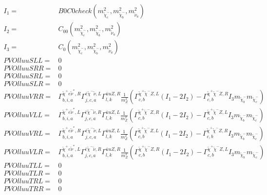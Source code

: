 \documentclass[A4,landscape]{article}
\begin{document}
\begin{align} 
I_1= & B0C0check(m^2_{\tilde{\chi}^-_{{c}}}, m^2_{\tilde{\chi}^-_{{b}}}, m^2_{\tilde{\nu}_{{a}}}) \\ 
I_2= & C_{00}(m^2_{\tilde{\chi}^-_{{c}}}, m^2_{\tilde{\chi}^-_{{b}}}, m^2_{\tilde{\nu}_{{a}}}) \\ 
I_3= & C_0(m^2_{\tilde{\chi}^-_{{c}}}, m^2_{\tilde{\chi}^-_{{b}}}, m^2_{\tilde{\nu}_{{a}}}) \\ 
  PVOlluuSLL= & 0 \\ 
  PVOlluuSRR= & 0 \\ 
  PVOlluuSRL= & 0 \\ 
  PVOlluuSLR= & 0 \\ 
  PVOlluuVRR= &  \Gamma^{\tilde{\chi}^+e \tilde{\nu}^*,R}_{b, i, a} \Gamma^{\bar{e}\tilde{\chi}^- \tilde{\nu} ,L}_{j, c, a} \Gamma^{\bar{u}u Z ,R}_{l, k} \frac{1}{m^2_{Z}} (\Gamma^{\tilde{\chi}^+\tilde{\chi}^- Z ,L}_{c, b} (I_1 - 2 I_2) - \Gamma^{\tilde{\chi}^+\tilde{\chi}^- Z ,R}_{c, b} I_3 m_{\tilde{\chi}^-_{{b}}} m_{\tilde{\chi}^-_{{c}}}) \\ 
  PVOlluuVLL= &  \Gamma^{\tilde{\chi}^+e \tilde{\nu}^*,L}_{b, i, a} \Gamma^{\bar{e}\tilde{\chi}^- \tilde{\nu} ,R}_{j, c, a} \Gamma^{\bar{u}u Z ,L}_{l, k} \frac{1}{m^2_{Z}} (\Gamma^{\tilde{\chi}^+\tilde{\chi}^- Z ,R}_{c, b} (I_1 - 2 I_2) - \Gamma^{\tilde{\chi}^+\tilde{\chi}^- Z ,L}_{c, b} I_3 m_{\tilde{\chi}^-_{{b}}} m_{\tilde{\chi}^-_{{c}}}) \\ 
  PVOlluuVRL= &  \Gamma^{\tilde{\chi}^+e \tilde{\nu}^*,R}_{b, i, a} \Gamma^{\bar{e}\tilde{\chi}^- \tilde{\nu} ,L}_{j, c, a} \Gamma^{\bar{u}u Z ,L}_{l, k} \frac{1}{m^2_{Z}} (\Gamma^{\tilde{\chi}^+\tilde{\chi}^- Z ,L}_{c, b} (I_1 - 2 I_2) - \Gamma^{\tilde{\chi}^+\tilde{\chi}^- Z ,R}_{c, b} I_3 m_{\tilde{\chi}^-_{{b}}} m_{\tilde{\chi}^-_{{c}}}) \\ 
  PVOlluuVLR= &  \Gamma^{\tilde{\chi}^+e \tilde{\nu}^*,L}_{b, i, a} \Gamma^{\bar{e}\tilde{\chi}^- \tilde{\nu} ,R}_{j, c, a} \Gamma^{\bar{u}u Z ,R}_{l, k} \frac{1}{m^2_{Z}} (\Gamma^{\tilde{\chi}^+\tilde{\chi}^- Z ,R}_{c, b} (I_1 - 2 I_2) - \Gamma^{\tilde{\chi}^+\tilde{\chi}^- Z ,L}_{c, b} I_3 m_{\tilde{\chi}^-_{{b}}} m_{\tilde{\chi}^-_{{c}}}) \\ 
  PVOlluuTLL= & 0 \\ 
  PVOlluuTLR= & 0 \\ 
  PVOlluuTRL= & 0 \\ 
  PVOlluuTRR= & 0 \\ 
\end{align} 
\end{document}
